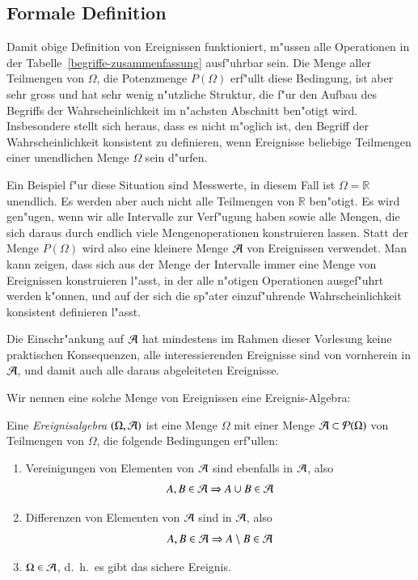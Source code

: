 \subsection{Formale Definition}
Damit obige Definition von Ereignissen funktioniert, m"ussen
alle Operationen in der Tabelle~\ref{begriffe-zusammenfassung}
ausf"uhrbar sein.
Die Menge aller Teilmengen von $\Omega$, die Potenzmenge
$P(\Omega)$ erf"ullt diese Bedingung,
ist aber sehr gross und hat sehr wenig n"utzliche Struktur, die
f"ur den Aufbau des Begriffs der Wahrscheinlichkeit im n"achsten
Abschnitt ben"otigt wird.
Insbesondere stellt sich heraus, dass es nicht m"oglich ist,
den Begriff der Wahrscheinlichkeit konsistent zu definieren, wenn
Ereignisse beliebige Teilmengen einer unendlichen Menge $\Omega$
sein d"urfen.

Ein Beispiel f"ur diese Situation sind Messwerte, in diesem
Fall ist $\Omega=\mathbb R$ unendlich.
Es werden aber auch nicht alle Teilmengen von $\mathbb R$ ben"otigt.
Es wird gen"ugen, wenn wir alle Intervalle zur Verf"ugung haben sowie
alle Mengen, die sich daraus durch endlich viele Mengenoperationen
konstruieren lassen.
Statt der Menge $P(\Omega)$ wird also eine kleinere Menge $\cal A$
von Ereignissen verwendet.
Man kann zeigen, dass sich aus der Menge der Intervalle immer 
eine Menge von Ereignissen konstruieren l"asst, in der alle
n"otigen Operationen ausgef"uhrt werden k"onnen, und auf der sich
die sp"ater einzuf"uhrende Wahrscheinlichkeit konsistent definieren
l"asst.

Die Einschr"ankung auf $\cal A$ hat mindestens im Rahmen dieser
Vorlesung keine praktischen Konsequenzen, alle interessierenden
Ereignisse sind von vornherein in $\cal A$, und damit auch alle daraus
abgeleiteten Ereignisse.

Wir nennen eine solche Menge von Ereignissen eine Ereignis-Algebra:

\begin{definition}
\label{def-ereignisalgebra}
Eine {\em Ereignisalgebra} $(\Omega,{\cal A})$ ist
eine Menge $\Omega$ mit einer Menge ${\cal A }\subset{\cal P}(\Omega)$
von Teilmengen von $\Omega$, die folgende Bedingungen erf"ullen:
\begin{enumerate}
\item Vereinigungen von Elementen von ${\cal A}$ sind ebenfalls in ${\cal A}$,
also
\[
A,B\in {\cal A}\Rightarrow A\cup B\in{\cal A}
\]
\item Differenzen von Elementen von ${\cal A}$ sind in ${\cal A}$, also
\[
A,B\in {\cal A}\Rightarrow A\setminus B\in{\cal A}
\]
\item $\Omega\in{\cal A}$, d.~h.~es gibt das sichere Ereignis.
\end{enumerate}
\end{definition}

